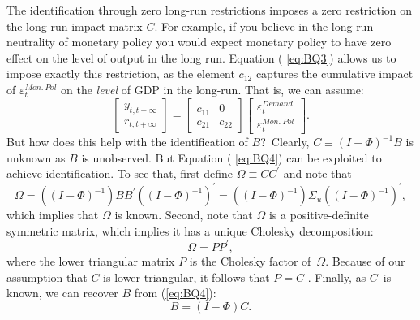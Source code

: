 \documentclass[10pt]{article}
\begin{document}
The identification through zero long-run restrictions imposes a zero
restriction on the long-run impact matrix $C$. For example, if you believe
in the long-run neutrality of monetary policy you would expect monetary
policy to have zero effect on the level of output in the long run. Equation (%
\ref{eq:BQ3}) allows us to impose exactly this restriction, as the element $%
c_{12}$ captures the cumulative impact of $\varepsilon _{t}^{Mon.\ Pol}$ on
the \emph{level} of GDP in the long-run. That is, we can assume:%
\begin{equation}
\left[
\begin{array}{c}
y_{t,t+\infty } \\
r_{t,t+\infty }%
\end{array}%
\right] =\left[
\begin{array}{cc}
c_{11} & 0 \\
c_{21} & c_{22}%
\end{array}%
\right]
\begin{bmatrix}
\varepsilon _{t}^{Demand} \\
\varepsilon _{t}^{Mon.\ Pol}%
\end{bmatrix}%
.  \label{eq:BQ5}
\end{equation}%
But how does this help with the identification of $B$?\ Clearly, $C\equiv
\left( I-\Phi \right) ^{-1}B$ is unknown as $B$ is unobserved. But Equation (%
\ref{eq:BQ4}) can be exploited to achieve identification. To see that, first
define $\Omega \equiv CC^{\prime }$ and note that
\begin{equation}
\Omega =\left( \left( I-\Phi \right) ^{-1}\right) BB^{\prime }\left( \left(
I-\Phi \right) ^{-1}\right) ^{\prime }=\left( \left( I-\Phi \right)
^{-1}\right) \Sigma _{u}\left( \left( I-\Phi \right) ^{-1}\right) ^{\prime },
\label{eq:BQ6}
\end{equation}%
which implies that $\Omega $ is known. Second, note that $\Omega $ is a
positive-definite symmetric matrix, which implies it has a unique Cholesky
decomposition:%
\begin{equation}
\Omega =PP^{\prime },  \label{eq:BQ7}
\end{equation}%
where the lower triangular matrix $P$ is the Cholesky factor of\ $\Omega $.
Because of our assumption that $C$ is lower triangular, it follows that $P=C$%
. Finally, as $C$\ is known, we can recover $B$ from (\ref{eq:BQ4}):%
\begin{equation}
B=\left( I-\Phi \right) C.  \label{eq:BQ8}
\end{equation}
\end{document}
